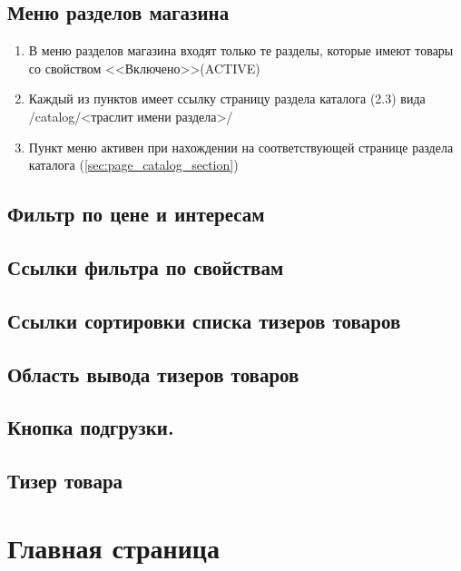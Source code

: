         \subsection{Меню разделов магазина}
            \begin{enumerate}
                \item В меню разделов магазина входят только те разделы, которые имеют товары со свойством <<Включено>>(ACTIVE)
                \item Каждый из пунктов имеет ссылку страницу раздела каталога (2.3) вида /catalog/<траслит имени раздела>/
                \item Пункт меню активен при нахождении на соответствующей странице раздела каталога (\ref{sec:page_catalog_section})
            \end{enumerate}
        \subsection{Фильтр по цене и интересам}
            \label{sec:baseitems_interest_filter}
        \subsection{Ссылки фильтра по свойствам}
            \label{sec:baseitems_props_filter}
        \subsection{Ссылки сортировки списка тизеров товаров}
            \label{sec:baseitems_goods_sort}
        \subsection{Область вывода тизеров товаров}
            \label{sec:baseitems_goods_area}
        \subsection{Кнопка подгрузки.}
            \label{sec:baseitems_goods_more}
        \subsection{Тизер товара}




    \section{Главная страница}


